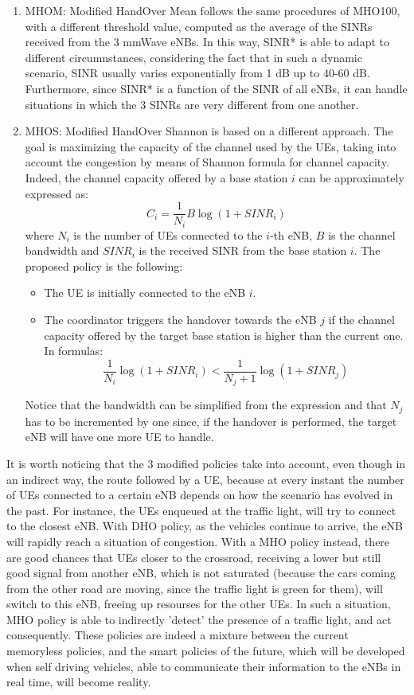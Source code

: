 \documentclass[conference,10pt]{IEEEtran}
\begin{document}
\begin{enumerate}
\item MHOM:
Modified HandOver Mean follows the same procedures of MHO100, with a different threshold value, computed as the average of the SINRs received from the 3 mmWave eNBs. In this way, SINR* is able to adapt to different circumnstances, considering the fact that in such a dynamic scenario, SINR usually varies exponentially from 1 dB up to 40-60 dB. Furthermore, since SINR* is a function of the SINR of all eNBs, it can handle situations in which the 3 SINRs are very different from one another.



\item MHOS:
Modified HandOver Shannon is based on a different approach. The goal is maximizing the capacity of the channel used by the UEs, taking into account the congestion by means of Shannon formula for channel capacity. Indeed, the channel capacity offered by a base station $i$ can be approximately expressed as:
 $$
 C_i=\frac{1}{N_i} B \log(1+SINR_i)
 $$
\noindent where $N_i$ is the number of UEs connected to the $i$-th eNB, $B$ is the channel bandwidth and $SINR_i$ is the received SINR from the base station $i$.
The proposed policy is the following:

\begin{itemize}
	\item The UE is initially connected to the eNB $i$.
	\item The coordinator triggers the handover towards the eNB $j$ if the channel capacity offered by the target base station is higher than the current one. In formulas:
	$$
	\frac{1}{N_i} \log(1+SINR_i) < \frac{1}{N_j+1} \log(1+SINR_j)
	$$ 
\end{itemize}
\noindent Notice that the bandwidth can be simplified from the expression and that $N_j$ has to be incremented by one since, if the handover is performed, the target eNB will have one more UE to handle.
\end{enumerate}

It is worth noticing that the 3 modified policies take into account, even though in an indirect way, the route followed by a UE, because at every instant the number of UEs connected to a certain eNB depends on how the scenario has evolved in the past. For instance, the UEs enqueued at the traffic light, will try to connect to the closest eNB. With DHO policy, as the vehicles continue to arrive, the eNB will rapidly reach a situation of congestion. With a MHO policy instead, there are good chances that UEs closer to the crossroad, receiving a lower but still good signal from another eNB, which is not saturated (because the cars coming from the other road are moving, since the traffic light is green for them), will switch to this eNB, freeing up resourses for the other UEs. In such a situation, MHO policy is able to indirectly 'detect' the presence of a traffic light, and act consequently. These policies are indeed a mixture between the current memoryless policies, and the smart policies of the future, which will be developed when self driving vehicles, able to communicate their information to the eNBs in real time, will become reality.
\end{document}
